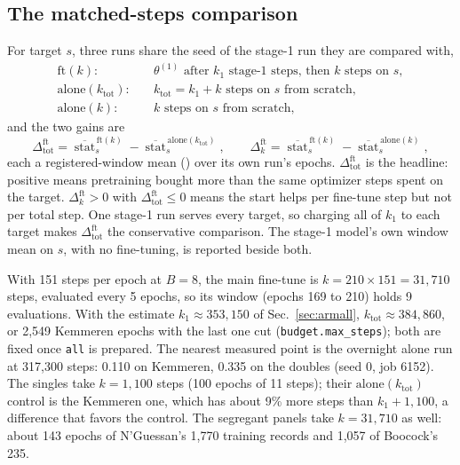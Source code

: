 \subsection{The matched-steps comparison}
\label{sec:ftcompare}

For target $s$, three runs share the seed of the stage-1 run they are compared with,
\begin{equation}
\begin{aligned}
\mathrm{ft}(k):&\quad \theta^{(1)} \text{ after } k_1 \text{ stage-1 steps, then } k \text{ steps on } s,\\
\mathrm{alone}(k_{\mathrm{tot}}):&\quad k_{\mathrm{tot}} = k_1 + k \text{ steps on } s \text{ from scratch},\\
\mathrm{alone}(k):&\quad k \text{ steps on } s \text{ from scratch},
\end{aligned}
\label{eq:ftruns}
\end{equation}
and the two gains are
\begin{equation}
\Delta^{\mathrm{ft}}_{\mathrm{tot}} = \overline{\operatorname{stat}}^{\,\mathrm{ft}(k)}_s - \overline{\operatorname{stat}}^{\,\mathrm{alone}(k_{\mathrm{tot}})}_s,
\qquad
\Delta^{\mathrm{ft}}_{k} = \overline{\operatorname{stat}}^{\,\mathrm{ft}(k)}_s - \overline{\operatorname{stat}}^{\,\mathrm{alone}(k)}_s,
\label{eq:ftgain}
\end{equation}
each a registered-window mean () over its own run's epochs. $\Delta^{\mathrm{ft}}_{\mathrm{tot}}$ is
the headline: positive means pretraining bought more than the same optimizer steps spent on the
target. $\Delta^{\mathrm{ft}}_{k} > 0$ with $\Delta^{\mathrm{ft}}_{\mathrm{tot}} \le 0$ means the
start helps per fine-tune step but not per total step. One stage-1 run serves every target, so
charging all of $k_1$ to each target makes $\Delta^{\mathrm{ft}}_{\mathrm{tot}}$ the conservative
comparison. The stage-1 model's own window mean on $s$, with no fine-tuning, is reported beside
both.

With 151 steps per epoch at $B = 8$, the main fine-tune is $k = 210 \times 151 = 31{,}710$
steps, evaluated every 5 epochs, so its window (epochs 169 to 210) holds 9 evaluations. With
the estimate $k_1 \approx 353{,}150$ of Sec.~\ref{sec:armall}, $k_{\mathrm{tot}} \approx
384{,}860$, or 2{,}549 Kemmeren epochs with the last one cut (\texttt{budget.max\_steps}); both
are fixed once \texttt{all} is prepared. The nearest measured point is the overnight alone run
at 317{,}300 steps: 0.110 on Kemmeren, 0.335 on the doubles (seed 0, job 6152). The singles take
$k = 1{,}100$ steps (100 epochs of 11 steps); their $\mathrm{alone}(k_{\mathrm{tot}})$ control is
the Kemmeren one, which has about 9\% more steps than $k_1 + 1{,}100$, a difference that favors
the control. The segregant panels take $k = 31{,}710$ as well: about 143 epochs of N'Guessan's
1{,}770 training records and 1{,}057 of Boocock's 235.

